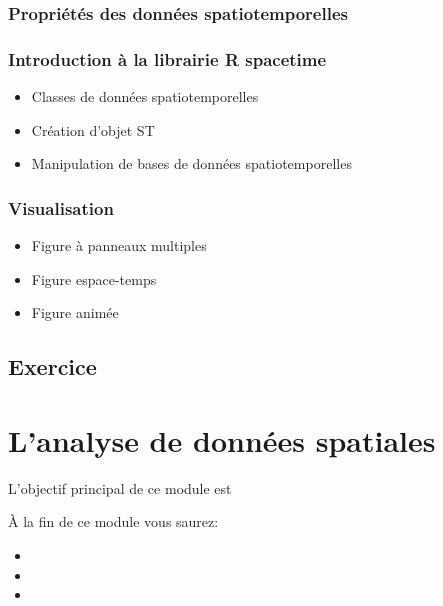 \documentclass[
  12pt,
]{krantz}
\providecommand{\tightlist}{%
  \setlength{\itemsep}{0pt}\setlength{\parskip}{0pt}}
\begin{document}
\hypertarget{propriuxe9tuxe9s-des-donnuxe9es-spatiotemporelles}{%
\subsection{Propriétés des données spatiotemporelles}\label{propriuxe9tuxe9s-des-donnuxe9es-spatiotemporelles}}

\hypertarget{introduction-uxe0-la-librairie-r-spacetime}{%
\subsection{Introduction à la librairie R spacetime}\label{introduction-uxe0-la-librairie-r-spacetime}}

\begin{itemize}
\tightlist
\item
  Classes de données spatiotemporelles
\item
  Création d'objet ST
\item
  Manipulation de bases de données spatiotemporelles
\end{itemize}

\hypertarget{visualisation}{%
\subsection{Visualisation}\label{visualisation}}

\begin{itemize}
\tightlist
\item
  Figure à panneaux multiples
\item
  Figure espace-temps
\item
  Figure animée
\end{itemize}

\hypertarget{exercice-7}{%
\section{Exercice}\label{exercice-7}}

\hypertarget{analyse}{%
\chapter{L'analyse de données spatiales}\label{analyse}}

L'objectif principal de ce module est

À la fin de ce module vous saurez:

\begin{itemize}
\item
\item
\item
\end{itemize}
\end{document}
